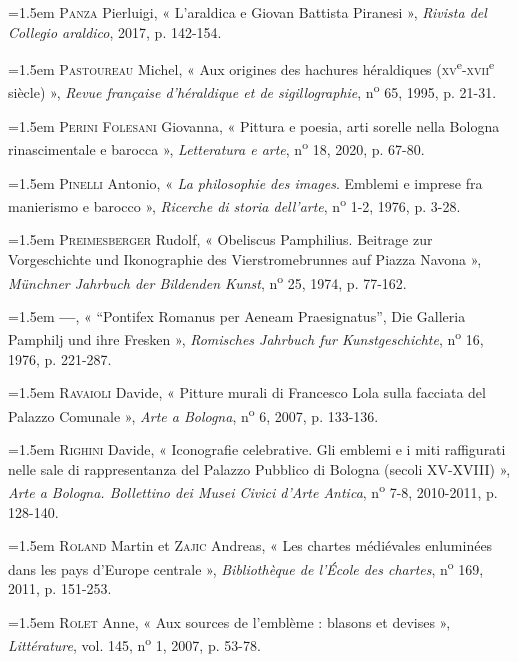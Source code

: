 \documentclass[12pt,twoside,openany]{book}
\newenvironment{PurhBibliography}
  {%
    \par
    \setlength{\parindent}{0pt}%
    \setlength{\leftskip}{0pt}%
  }
  {%
    \par
  }
\begin{document}
\begin{PurhBibliography}
\noindent\hangindent=1.5em \textsc{Panza} Pierluigi, « L’araldica e Giovan Battista Piranesi », \textit{Rivista del Collegio araldico}, 2017, p. 142-154.\par
\noindent\hangindent=1.5em \textsc{Pastoureau} Michel, « Aux origines des hachures héraldiques (\textsc{xv}\textsuperscript{e}-\textsc{xvii}\textsuperscript{e} siècle) », \textit{Revue française d’héraldique et de sigillographie}, n\textsuperscript{o} 65, 1995, p. 21-31.\par
\noindent\hangindent=1.5em \textsc{Perini Folesani} Giovanna, « Pittura e poesia, arti sorelle nella Bologna rinascimentale e barocca », \textit{Letteratura e arte}, n\textsuperscript{o} 18, 2020, p. 67-80.\par
\noindent\hangindent=1.5em \textsc{Pinelli} Antonio, « \textit{La philosophie des images}. Emblemi e imprese fra manierismo e barocco », \textit{Ricerche di storia dell’arte}, n\textsuperscript{o} 1-2, 1976, p. 3-28.\par
\noindent\hangindent=1.5em \textsc{Preimesberger} Rudolf, « Obeliscus Pamphilius. Beitrage zur Vorgeschichte und Ikonographie des Vierstromebrunnes auf Piazza Navona », \textit{Münchner Jahrbuch der Bildenden Kunst}, n\textsuperscript{o} 25, 1974, p. 77-162.\par
\noindent\hangindent=1.5em \textbf{—}, « “Pontifex Romanus per Aeneam Praesignatus”, Die Galleria Pamphilj und ihre Fresken », \textit{Romisches Jahrbuch fur Kunstgeschichte}, n\textsuperscript{o} 16, 1976, p. 221-287.\par
\noindent\hangindent=1.5em \textsc{Ravaioli} Davide, « Pitture murali di Francesco Lola sulla facciata del Palazzo Comunale », \textit{Arte a Bologna}, n\textsuperscript{o} 6, 2007, p. 133-136.\par
\noindent\hangindent=1.5em \textsc{Righini} Davide, « Iconografie celebrative. Gli emblemi e i miti raffigurati nelle sale di rappresentanza del Palazzo Pubblico di Bologna (secoli \textsc{XV}-\textsc{XVIII}) », \textit{Arte a Bologna. Bollettino dei Musei Civici d’Arte Antica}, n\textsuperscript{o} 7-8, 2010-2011, p. 128-140.\par
\noindent\hangindent=1.5em \textsc{Roland} Martin et \textsc{Zajic} Andreas, « Les chartes médiévales enluminées dans les pays d’Europe centrale », \textit{Bibliothèque de l’École des chartes}, n\textsuperscript{o} 169, 2011, p. 151-253.\par
\noindent\hangindent=1.5em \textsc{Rolet} Anne, « Aux sources de l’emblème : blasons et devises », \textit{Littérature}, vol. 145, n\textsuperscript{o} 1, 2007, p. 53-78.\par

\end{PurhBibliography}
\end{document}
